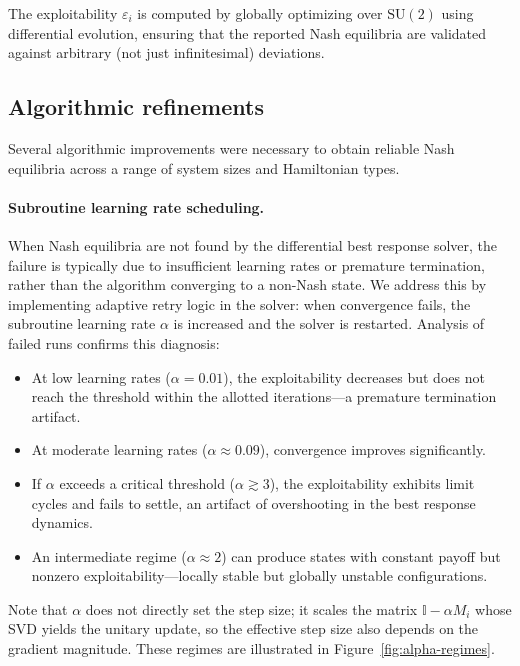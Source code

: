 \documentclass[12pt]{article}
\begin{document}
The exploitability $\varepsilon_i$ is computed by globally optimizing over $\mathrm{SU}(2)$
using differential evolution,
ensuring that the reported Nash equilibria are validated against arbitrary (not just infinitesimal) deviations.

\subsection{Algorithmic refinements}
\label{sec:algorithm-refinements}

Several algorithmic improvements were necessary to obtain reliable Nash equilibria
across a range of system sizes and Hamiltonian types.

\paragraph{Subroutine learning rate scheduling.}
When Nash equilibria are not found by the differential best response solver,
the failure is typically due to insufficient learning rates or premature termination,
rather than the algorithm converging to a non-Nash state.
We address this by implementing adaptive retry logic in the solver:
when convergence fails, the subroutine learning rate $\alpha$ is increased
and the solver is restarted. Analysis of failed runs confirms this diagnosis:
\begin{itemize}
    \item At low learning rates ($\alpha = 0.01$), the exploitability decreases but does not
    reach the threshold within the allotted iterations---a premature termination artifact.
    \item At moderate learning rates ($\alpha \approx 0.09$), convergence improves significantly.
    \item If $\alpha$ exceeds a critical threshold ($\alpha \gtrsim 3$),
    the exploitability exhibits limit cycles and fails to settle,
    an artifact of overshooting in the best response dynamics.
    \item An intermediate regime ($\alpha \approx 2$) can produce states with
    constant payoff but nonzero exploitability---locally stable but globally unstable configurations.
\end{itemize}
Note that $\alpha$ does not directly set the step size; it scales the matrix
$\mathbb{I} - \alpha M_i$ whose SVD yields the unitary update,
so the effective step size also depends on the gradient magnitude.
These regimes are illustrated in Figure~\ref{fig:alpha-regimes}.
\end{document}
